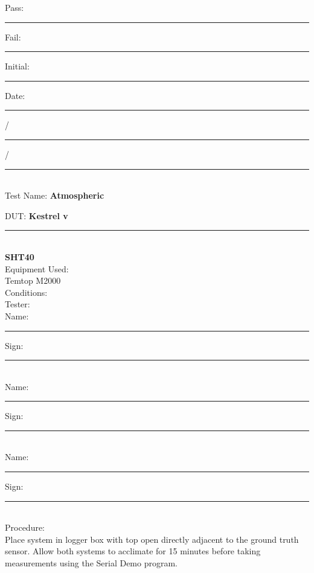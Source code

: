 
\vfill
{\large Pass: \rule{1cm}{0.15mm} \hspace{1cm} Fail: \rule{1cm}{0.15mm}} \hfill Initial: \rule{2cm}{0.15mm} \hspace{1cm} Date: \rule{0.5cm}{0.15mm}/\rule{0.5cm}{0.15mm}/\rule{1cm}{0.15mm}\\[5pt]

\pagebreak
\noindent
{\Huge Test Name: \textbf{Atmospheric}}\\[20pt]
{\Large DUT: \textbf{Kestrel v}\rule{1cm}{0.15mm}}\\ \textbf{SHT40} \\[10pt]
{\Large Equipment Used: }\\[10pt]Temtop M2000\\[40pt]
{\Large Conditions: }\\[40pt]
{\Large Tester: }\\[10pt]
Name: \rule{4cm}{0.15mm} \hfill Sign: \rule{4cm}{0.15mm}\\[5pt]
Name: \rule{4cm}{0.15mm} \hfill Sign: \rule{4cm}{0.15mm}\\[5pt]
Name: \rule{4cm}{0.15mm} \hfill Sign: \rule{4cm}{0.15mm}\\[15pt]
{\Large Procedure: }\\
Place system in logger box with top open directly adjacent to the ground truth sensor. Allow both systems to acclimate for 15 minutes before taking measurements using the Serial Demo program. 

